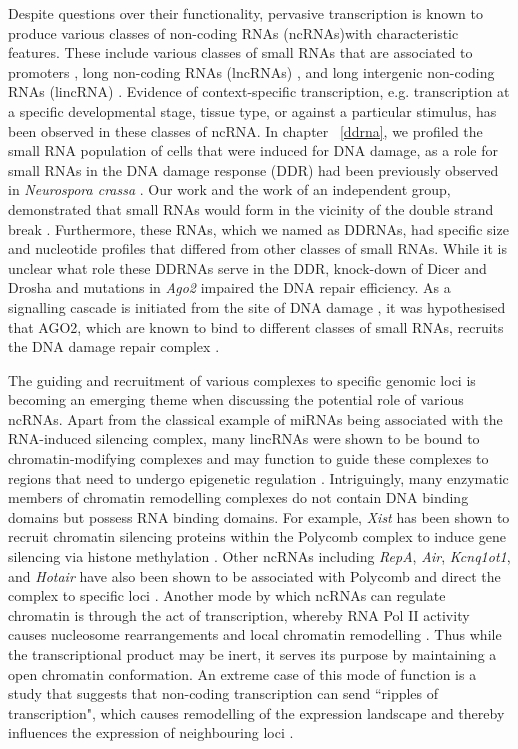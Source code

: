 Despite questions over their functionality, pervasive transcription is known to produce various classes of non-coding RNAs (ncRNAs)with characteristic features. These include various classes of small RNAs that are associated to promoters \citep{pmid19920851}, long non-coding RNAs (lncRNAs) \citep{pmid24290031}, and long intergenic non-coding RNAs (lincRNA) \citep{pmid23818866}. Evidence of context-specific transcription, e.g. transcription at a specific developmental stage, tissue type, or against a particular stimulus, has been observed in these classes of ncRNA. In chapter ~\ref{ddrna}, we profiled the small RNA population of cells that were induced for DNA damage, as a role for small RNAs in the DNA damage response (DDR) had been previously observed in \textit{Neurospora crassa} \citep{pmid19444217}. Our work and the work of an independent group, demonstrated that small RNAs would form in the vicinity of the double strand break \citep{francia2012site,pmid22445173}. Furthermore, these RNAs, which we named as DDRNAs, had specific size and nucleotide profiles that differed from other classes of small RNAs. While it is unclear what role these DDRNAs serve in the DDR, knock-down of Dicer and Drosha \citep{francia2012site} and mutations in \textit{Ago2} \citep{pmid22445173} impaired the DNA repair efficiency. As a signalling cascade is initiated from the site of DNA damage \citep{pmid19847258}, it was hypothesised that AGO2, which are known to bind to different classes of small RNAs, recruits the DNA damage repair complex \citep{pmid22445173}.

The guiding and recruitment of various complexes to specific genomic loci is becoming an emerging theme when discussing the potential role of various ncRNAs. Apart from the classical example of miRNAs being associated with the RNA-induced silencing complex, many lincRNAs were shown to be bound to chromatin-modifying complexes and may function to guide these complexes to regions that need to undergo epigenetic regulation \citep{pmid21915889,pmid19571010}. Intriguingly, many enzymatic members of chromatin remodelling complexes do not contain DNA binding domains but possess RNA binding domains. For example, \textit{Xist} has been shown to recruit chromatin silencing proteins within the Polycomb complex to induce gene silencing via histone methylation \citep{pmid17869504}. Other ncRNAs including \textit{RepA}, \textit{Air}, \textit{Kcnq1ot1}, and \textit{Hotair} have also been shown to be associated with Polycomb and direct the complex to specific loci \citep{pmid21915889}. Another mode by which ncRNAs can regulate chromatin is through the act of transcription, whereby RNA Pol II activity causes nucleosome rearrangements and local chromatin remodelling \citep{pmid16094312}. Thus while the transcriptional product may be inert, it serves its purpose by maintaining a open chromatin conformation. An extreme case of this mode of function is a study that suggests that non-coding transcription can send ``ripples of transcription", which causes remodelling of the expression landscape and thereby influences the expression of neighbouring loci \citep{pmid19160492}.

